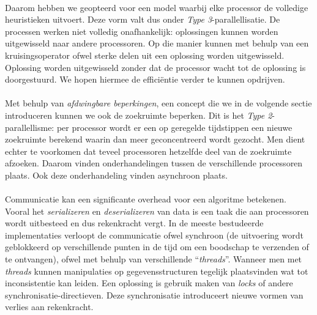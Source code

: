 \paragraph{}
Daarom hebben we geopteerd voor een model waarbij elke processor de volledige heuristieken uitvoert. Deze vorm valt dus onder \emph{Type 3}-parallellisatie. De processen werken niet volledig onafhankelijk: oplossingen kunnen worden uitgewisseld naar andere processoren. Op die manier kunnen met behulp van een kruisingsoperator ofwel \emph{\abco{}} sterke delen uit een oplossing worden uitgewisseld. Oplossing worden uitgewisseld zonder dat de processor wacht tot de oplossing is doorgestuurd. We hopen hiermee de effici\"entie verder te kunnen opdrijven.

\paragraph{}
Met behulp van \emph{afdwingbare beperkingen}, een concept die we in de volgende sectie introduceren kunnen we ook de zoekruimte beperken. Dit is het \emph{Type 2}-parallellisme: per processor wordt er een op geregelde tijdstippen een nieuwe zoekruimte berekend waarin dan meer geconcentreerd wordt gezocht. Men dient echter te voorkomen dat teveel processoren hetzelfde deel van de zoekruimte afzoeken. Daarom vinden onderhandelingen tussen de verschillende processoren plaats. Ook deze onderhandeling vinden asynchroon plaats.

\paragraph{}
Communicatie kan een significante overhead voor een algoritme betekenen. Vooral het \emph{serializeren} en \emph{deserializeren} van data is een taak die aan processoren wordt uitbesteed en dus rekenkracht vergt. In de meeste bestudeerde implementaties verloopt de communicatie ofwel synchroon (de uitvoering wordt geblokkeerd op verschillende punten in de tijd om een boodschap te verzenden of te ontvangen), ofwel met behulp van verschillende ``\emph{threads}''. Wanneer men met \emph{threads} kunnen manipulaties op gegevensstructuren tegelijk plaatsvinden wat tot inconsistentie kan leiden. Een oplossing is gebruik maken van \emph{locks} of andere synchronisatie-directieven. Deze synchronisatie introduceert nieuwe vormen van verlies aan rekenkracht.

